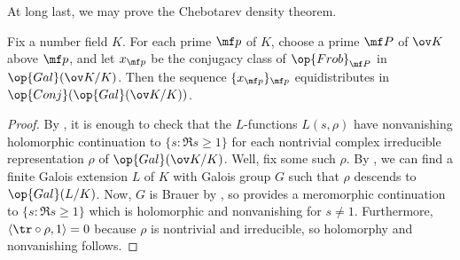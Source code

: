 \documentclass[../thesis.tex]{subfiles}
\begin{document}
At long last, we may prove the Chebotarev density theorem.
\begin{theorem}
	Fix a number field $K$. For each prime $\mf p$ of $K$, choose a prime $\mf P$ of $\ov K$ above $\mf p$, and let $x_{\mf p}$ be the conjugacy class of $\op{Frob}_{\mf P}$ in $\op{Gal}(\ov K/K)$. Then the sequence $\{x_{\mf p}\}_{\mf p}$ equidistributes in $\op{Conj}(\op{Gal}(\ov K/K))$.
\end{theorem}
\begin{proof}
	By , it is enough to check that the $L$-functions $L(s,\rho)$ have nonvanishing holomorphic continuation to $\{s:\Re s\ge1\}$ for each nontrivial complex irreducible representation $\rho$ of $\op{Gal}(\ov K/K)$. Well, fix some such $\rho$. By , we can find a finite Galois extension $L$ of $K$ with Galois group $G$ such that $\rho$ descends to $\op{Gal}(L/K)$. Now, $G$ is Brauer by , so  provides a meromorphic continuation to $\{s:\Re s\ge1\}$ which is holomorphic and nonvanishing for $s\ne1$. Furthermore, $\langle{\tr}\circ\rho,1\rangle=0$ because $\rho$ is nontrivial and irreducible, so holomorphy and nonvanishing follows.
\end{proof}

\end{document}
